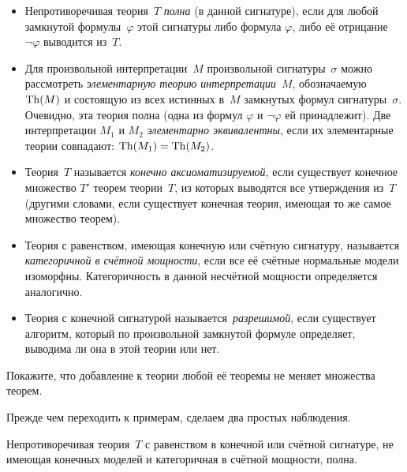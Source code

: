 \begin{itemize}
        \item
Непротиворечивая теория~$T$ \emph{полна}%
%
(в данной сигнатуре), если для
любой замкнутой формулы~$\varphi$ этой сигнатуры либо формула
$\varphi$, либо её отрицание $\lnot\varphi$ выводится из~$T$.

        \item
Для произвольной интерпретации~$M$ произвольной
сигнатуры~$\sigma$ можно рассмотреть \emph{элементарную теорию
интерпретации}~$M$,%
обозначаемую $\operatorname{Th}(M)$ и состоящую из всех
истинных в~$M$ замкнутых формул сигнатуры~$\sigma$. Очевидно,
эта теория полна (одна из формул $\varphi$ и $\lnot\varphi$ ей
принадлежит). Две интерпретации $M_1$ и $M_2$ \emph{элементарно
эквивалентны},%
если их элементарные теории совпадают: $\operatorname{Th}(M_1)=\operatorname{Th}(M_2)$.
        \item
Теория~$T$ называется \emph{конечно аксиоматизируемой},%
%
если существует
конечное множество $T'$ теорем теории~$T$, из которых выводятся
все утверждения из~$T$ (другими словами, если существует
конечная теория, имеющая то же самое множество теорем).
        \item
Теория с равенством, имеющая конечную или счётную сигнатуру,
называется \emph{категоричной в счётной мощности},%
если все её счётные нормальные модели изоморфны.
Категоричность в данной несчётной мощности определяется
аналогично.

        \item
Теория с конечной сигнатурой называется~\emph{разрешимой},%
%
если существует алгоритм, который по произвольной замкнутой
формуле определяет, выводима ли она в этой теории или нет.
\end{itemize}

\begin{problem}
Покажите, что добавление к теории любой её теоремы не меняет
множества теорем.
\end{problem}

Прежде чем переходить к примерам, сделаем два простых наблюдения.

\begin{theorem}
%
%
%
        \label{categorical-complete}%
Не\-про\-ти\-во\-ре\-чи\-вая теория~$T$ с равенством
в конечной или счётной
сигнатуре, не имеющая конечных моделей и
категоричная в счётной мощности, полна.
\end{theorem}

